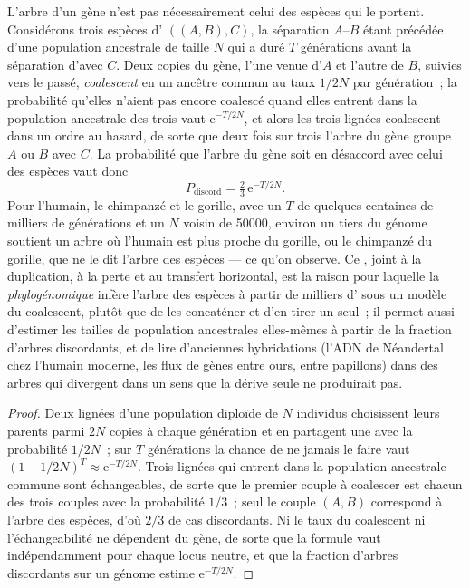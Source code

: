 \begin{proposition}\label{prop:b3:molecular-evolution:ils}
L'arbre d'un gène n'est pas nécessairement celui des espèces qui le
portent. Considérons trois espèces d' $((A,B),C)$, la
séparation $A$--$B$ étant précédée d'une population ancestrale de taille
$N$ qui a duré $T$ générations avant la séparation d'avec $C$. Deux
copies du gène, l'une venue d'$A$ et l'autre de $B$, suivies vers le
passé, \emph{coalescent} en un ancêtre commun au taux $1/2N$ par
génération~; la probabilité qu'elles n'aient pas encore coalescé quand
elles entrent dans la population ancestrale des trois vaut
$\mathrm{e}^{-T/2N}$, et alors les trois lignées coalescent dans un
ordre au hasard, de sorte que deux fois sur trois l'arbre du gène groupe
$A$ ou $B$ avec $C$. La probabilité que l'arbre du gène soit en
désaccord avec celui des espèces vaut donc
\[
P_{\text{discord}} = \tfrac{2}{3}\,\mathrm{e}^{-T/2N} .
\]
Pour l'humain, le chimpanzé et le gorille, avec un $T$ de quelques
centaines de milliers de générations et un $N$ voisin de \num{50000},
environ un tiers du génome soutient un arbre où l'humain est plus proche
du gorille, ou le chimpanzé du gorille, que ne le dit l'arbre des
espèces --- ce qu'on observe. Ce \emph{}, joint
à la duplication, à la perte et au transfert horizontal, est la raison
pour laquelle la \emph{phylogénomique} infère l'arbre des espèces à
partir de milliers d' sous un modèle du coalescent,
plutôt que de les concaténer et d'en tirer un seul~; il permet aussi
d'estimer les tailles de population ancestrales elles-mêmes à partir de
la fraction d'arbres discordants, et de lire d'anciennes hybridations
(l'ADN de Néandertal chez l'humain moderne, les flux de gènes entre
ours, entre papillons) dans des arbres qui divergent dans un sens que
la dérive seule ne produirait pas.
\end{proposition}
\begin{proof}
Deux lignées d'une population diploïde de $N$ individus choisissent
leurs parents parmi $2N$ copies à chaque génération et en partagent une
avec la probabilité $1/2N$~; sur $T$ générations la chance de ne jamais
le faire vaut $(1 - 1/2N)^{T} \approx
\mathrm{e}^{-T/2N}$. Trois lignées qui entrent dans la population
ancestrale commune sont échangeables, de sorte que le premier couple à
coalescer est chacun des trois couples avec la probabilité $1/3$~; seul
le couple $(A,B)$ correspond à l'arbre des espèces, d'où $2/3$ de cas
discordants. Ni le taux du coalescent ni l'échangeabilité ne dépendent
du gène, de sorte que la formule vaut indépendamment pour chaque locus
neutre, et que la fraction d'arbres discordants sur un génome estime
$\mathrm{e}^{-T/2N}$.
\end{proof}


